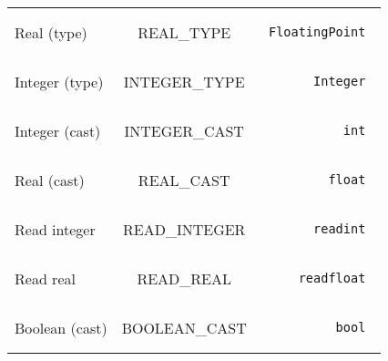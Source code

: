 \documentclass[a4paper,10pt]{article}
\begin{document}
\begin{tabular}{|l|c|r|}
  Real (type) & REAL\_TYPE & \begin{minipage}{2in} \begin{verbatim} FloatingPoint \end{verbatim} \end{minipage} \\
  Integer (type) & INTEGER\_TYPE & \begin{minipage}{2in} \begin{verbatim} Integer \end{verbatim} \end{minipage} \\
  Integer (cast) & INTEGER\_CAST & \begin{minipage}{2in} \begin{verbatim} int \end{verbatim} \end{minipage} \\
  Real (cast) & REAL\_CAST & \begin{minipage}{2in} \begin{verbatim} float \end{verbatim} \end{minipage} \\
  Read integer & READ\_INTEGER & \begin{minipage}{2in} \begin{verbatim} readint \end{verbatim} \end{minipage} \\
  Read real & READ\_REAL & \begin{minipage}{2in} \begin{verbatim} readfloat \end{verbatim} \end{minipage} \\
  Boolean (cast) & BOOLEAN\_CAST & \begin{minipage}{2in} \begin{verbatim} bool \end{verbatim} \end{minipage} \\
  \hline
\end{tabular}
\end{document}
